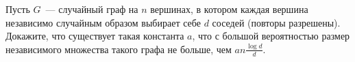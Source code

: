 Пусть $G$~--- случайный граф на $n$ вершинах, в котором каждая вершина независимо случайным образом
выбирает себе $d$ соседей (повторы разрешены). Докажите, что существует такая константа $a$, что с
большой вероятностью размер независимого множества такого графа не больше, чем $a n \frac{\log{d}}{d}$.
